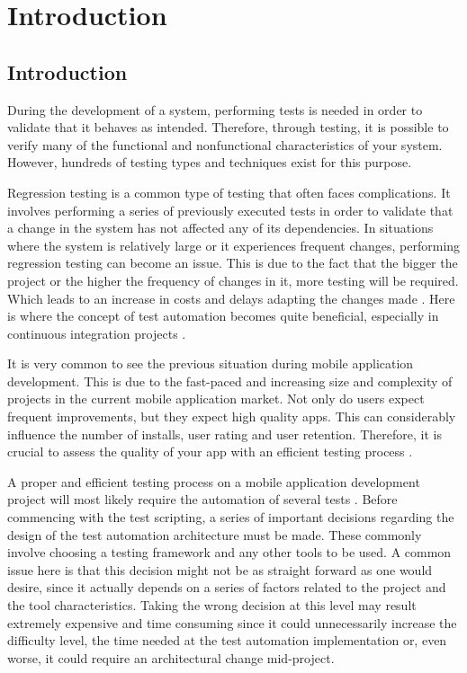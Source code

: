 %
\chapter{Introduction}
\label{sec:intro}

\section{Introduction}

During the development of a system, performing tests is needed in order to validate that it behaves as intended. Therefore, through testing, it is possible to verify many of the functional and nonfunctional characteristics of your system. However, hundreds of testing types and techniques exist for this purpose.

Regression testing is a common type of testing that often faces complications. It involves performing a series of previously executed tests in order to validate that a change in the system has not affected any of its dependencies. In situations where the system is relatively large or it experiences frequent changes, performing regression testing can become an issue. This is due to the fact that the bigger the project or the higher the frequency of changes in it, more testing will be required. Which leads to an increase in costs and delays adapting the changes made \cite{Google-Automate-UI-Tests}. Here is where the concept of test automation becomes quite beneficial, especially in continuous integration projects \cite{ISTQB}.

It is very common to see the previous situation during mobile application development. This is due to the fast-paced and increasing size and complexity of projects in the current mobile application market. Not only do users expect frequent improvements, but they expect high quality apps. This can considerably influence the number of installs, user rating and user retention. Therefore, it is crucial to assess the quality of your app with an efficient testing process \cite{Google-App-Quality}.

A proper and efficient testing process on a mobile application development project will most likely require the automation of several tests \cite{Gaurav-Why-Test-Automation}. Before commencing with the test scripting, a series of important decisions regarding the design of the test automation architecture must be made. These commonly involve choosing a testing framework and any other tools to be used. A common issue here is that this decision might not be as straight forward as one would desire, since it actually depends on a series of factors related to the project and the tool characteristics. Taking the wrong decision at this level may result extremely expensive and time consuming since it could unnecessarily increase the difficulty level, the time needed at the test automation implementation or, even worse, it could require an architectural change mid-project.

